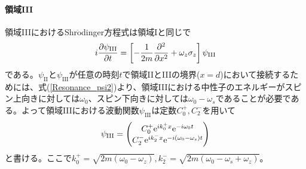 \paragraph{領域III}
領域IIIにおけるShr$\ddot{\mathrm{o}}$dinger方程式は領域Iと同じで
\begin{equation}
i\frac{\partial \psi_\mathrm{III}}{\partial t}= \left[-\frac{1}{2m} \frac{\partial^2}{\partial x^2} +\omega_z \sigma_z\right] \psi_\mathrm{III}
\end{equation}
である。$\psi_\mathrm{II}$と$\psi_\mathrm{III}$が任意の時刻$t$で領域IIとIIIの境界($x=d$)において接続するためには、式(\ref{Resonance_psi2})より、領域IIIにおける中性子のエネルギーがスピン上向きに対しては$\omega_0$、スピン下向きに対しては$\omega_0-\omega_s$であることが必要である。よって領域IIIにおける波動関数$\psi_\mathrm{III}$は定数$C_0^+,C_2^-$を用いて
\begin{equation}
\psi_\mathrm{III}=\begin{pmatrix} C_0^+ \mathrm{e}^{ik_0^+ x}\mathrm{e}^{-i\omega_0 t} \\ C_2^- \mathrm{e}^{ik_2^- x}\mathrm{e}^{-i(\omega_0-\omega_s) t} \end{pmatrix}
\end{equation}
と書ける。ここで$k_0^+=\sqrt{2m(\omega_0-\omega_z)},k_2^-=\sqrt{2m(\omega_0-\omega_s+\omega_z)}$。


